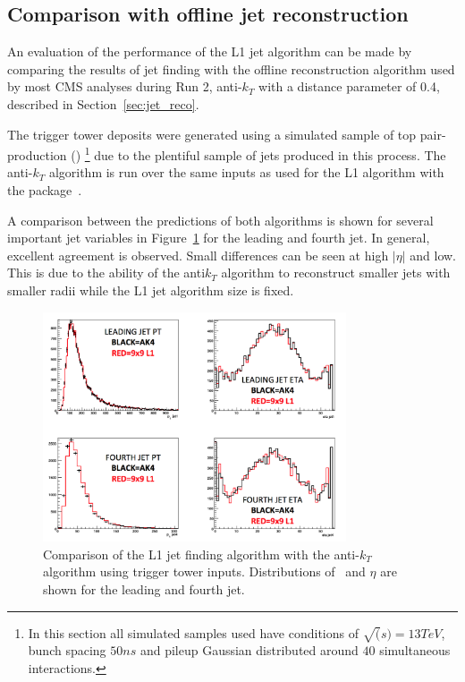 \subsection{Comparison with offline jet reconstruction}

An evaluation of the performance of the L1 jet algorithm can be made by comparing
the results of jet finding with the offline reconstruction algorithm used by 
most CMS analyses during Run 2, anti-$k_T$ with a distance
parameter of 0.4, described in Section~\ref{sec:jet_reco}. 

The trigger tower deposits were generated using a simulated sample of 
top pair-production (\ttj) \footnote{In this section all simulated samples used have conditions 
of $\sqrt(s) = 13TeV$, bunch spacing $50ns$ and pileup Gaussian distributed around $40$ simultaneous interactions.} 
due to the plentiful sample of jets produced in this process. The anti-$k_T$ algorithm is run over the same inputs as
used for the L1 algorithm with the \FASTJET package~\cite{fastjet}.

A comparison between the predictions of both algorithms is shown for several important jet variables in 
Figure~\ref{fig:jet_l1s2_compak4} for the leading and fourth jet. In general, excellent agreement is observed. 
Small differences can be seen at high $|\eta|$ and low\pt. This is due to the ability 
of the anti$k_T$ algorithm to reconstruct smaller jets with smaller radii while the L1 jet
algorithm size is fixed.


\begin{figure}
\centering
    \includegraphics[width=0.8\textwidth]{./Figures/triggerUpgrade/jet_l1s2_compak4}
  \caption{Comparison of the L1 jet finding algorithm with the anti-$k_T$ algorithm using
  trigger tower inputs. Distributions of \pt~and $\eta$ are shown for the leading and fourth
  jet.}
  \label{fig:jet_l1s2_compak4}
\end{figure}  
